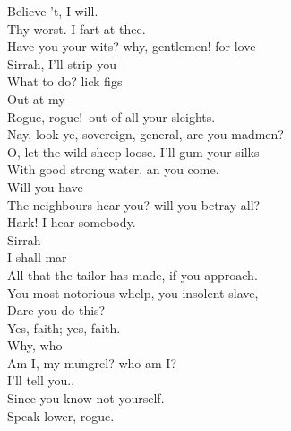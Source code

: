 \documentclass{memoir}
\begin{document}
\begin{drama*}


\act

\scene

\facespeaks  Believe 't, I will.\\
\subtlespeaks {} Thy worst. I fart at thee.\\
\dolspeaks  Have you your wits? why, gentlemen! for love--\\
\facespeaks  Sirrah, I'll strip you--\\
\subtlespeaks {} What to do? lick figs\\
 Out at my--\\
\facespeaks {} Rogue, rogue!--out of all your sleights.\\
\dolspeaks  Nay, look ye, sovereign, general, are you madmen?\\
\subtlespeaks  O, let the wild sheep loose. I'll gum your silks\\
 With good strong water, an you come.\\
\dolspeaks {} Will you have\\
 The neighbours hear you? will you betray all?\\
 Hark! I hear somebody.\\
\facespeaks {} Sirrah--\\
\subtlespeaks {} I shall mar\\
 All that the tailor has made, if you approach.\\
\facespeaks  You most notorious whelp, you insolent slave,\\
 Dare you do this?\\
\subtlespeaks {} Yes, faith; yes, faith.\\
\facespeaks {} Why, who\\
 Am I, my mungrel? who am I?\\
\subtlespeaks {} I'll tell you.,\\
 Since you know not yourself.\\
\facespeaks {} Speak lower, rogue.\\

\end{drama*}
\end{document}
